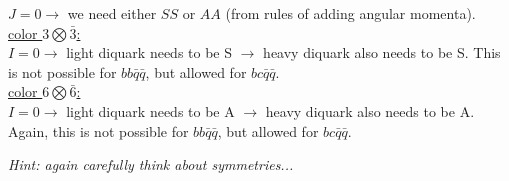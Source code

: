 \begin{enumerate}
	      \begin{solution}
		      $J=0 \rightarrow$ we need either $SS$ or $AA$ (from rules of adding angular momenta).\\ 
		      \underline{color $3 \bigotimes \bar{3}$:}\\
		      $I=0 \rightarrow$ light diquark needs to be S $\rightarrow$ heavy diquark also needs to be S. This is not possible
		      for $bb\bar{q}\bar{q}$, but allowed for $bc\bar{q}\bar{q}$.\\
		      \underline{color $6 \bigotimes \bar{6}$:}\\
		      $I=0 \rightarrow$ light diquark needs to be A $\rightarrow$ heavy diquark also needs to be A. Again, this is not possible for $bb\bar{q}\bar{q}$, but allowed for $bc\bar{q}\bar{q}$.		
	      \end{solution}
	      
	      {\em Hint: again carefully think about symmetries...}
	      
	      
	      
\end{enumerate}